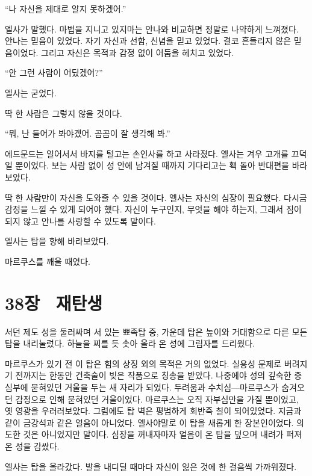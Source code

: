 ``나 자신을 제대로 알지 못하겠어.''

엘사가 말했다. 마법을 지니고 있지마는 안나와 비교하면 정말로 나약하게 느껴졌다. 안나는 믿음이 있었다. 자기 자신과 선함, 신념을 믿고 있었다. 결코 흔들리지 않은 믿음이었다. 그리고 자신은 목적과 감정 없이 어둠을 헤치고 있었다.

``안 그런 사람이 어딨겠어?''

엘사는 굳었다.

딱 한 사람은 그렇지 않을 것이다.

``뭐, 난 들어가 봐야겠어. 곰곰이 잘 생각해 봐.''

에드문드는 일어서서 바지를 털고는 손인사를 하고 사라졌다. 엘사는 겨우 고개를 끄덕일 뿐이었다. 보는 사람 없이 성 안에 남겨질 때까지 기다리고는 홱 돌아 반대편을 바라보았다.

딱 한 사람만이 자신을 도와줄 수 있을 것이다. 엘사는 자신의 심장이 필요했다. 다시금 감정을 느낄 수 있게 되어야 했다. 자신이 누구인지, 무엇을 해야 하는지, 그래서 짐이 되지 않고 안나를 사랑할 수 있도록 말이다.

엘사는 탑을 향해 바라보았다.

마르쿠스를 깨울 때였다.



\chapter[38장  재탄생][38장\hspace*{.5em}재탄생]{38장 \ 재탄생}



서던 제도 성을 둘러싸며 서 있는 뾰족탑 중, 가운데 탑은 높이와 거대함으로 다른 모든 탑을 내리눌렀다. 하늘을 찌를 듯 솟아 올라 온 성에 그림자를 드리웠다.

마르쿠스가 있기 전 이 탑은 힘의 상징 외의 목적은 거의 없었다. 실용성 문제로 버려지기 전까지는 한동안 건축술이 빚은 작품으로 칭송을 받았다. 나중에야 성의 깊숙한 중심부에 묻혀있던 거울을 두는 새 자리가 되었다. 두려움과 수치심—마르쿠스가 숨겨오던 감정으로 인해 묻혀있던 거울이었다. 마르쿠스는 오직 자부심만을 가질 뿐이었고, 옛 영광을 우러러보았다. 그럼에도 탑 벽은 평범하게 회반죽 칠이 되어있었다. 지금과 같이 금강석과 같은 얼음이 아니었다. 엘사야말로 이 탑을 새롭게 한 장본인이었다. 의도한 것은 아니었지만 말이다. 심장을 꺼내자마자 얼음이 온 탑을 덮으며 내려가 퍼져 온 성을 감쌌다.

엘사는 탑을 올라갔다. 발을 내디딜 때마다 자신이 잃은 것에 한 걸음씩 가까워졌다.

